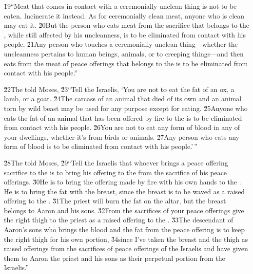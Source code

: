 \v{19}``Meat that comes in contact with a ceremonially unclean thing is not to be eaten. Incinerate it instead. As for ceremonially clean meat, anyone who is clean may eat it. \v{20}But the person who eats meat from the sacrifice that belongs to the , while still affected by his uncleanness, is to be eliminated from contact with his people. \v{21}Any person who touches a ceremonially unclean thing---whether the uncleanness pertains to human beings, animals, or to creeping things---and then eats from the meat of peace offerings that belongs to the  is to be eliminated from contact with his people.''

\v{22}The  told Moses, \v{23}``Tell the Israelis, `You are not to eat the fat of an ox, a lamb, or a goat. \v{24}The carcass of an animal that died of its own and an animal torn by wild beast may be used for any purpose except for eating. \v{25}Anyone who eats the fat of an animal that has been offered by fire to the  is to be eliminated from contact with his people. \v{26}You are not to eat any form of blood in any of your dwellings, whether it's from birds or animals. \v{27}Any person who eats any form of blood is to be eliminated from contact with his people.'\,''

\v{28}The  told Moses, \v{29}``Tell the Israelis that whoever brings a peace offering sacrifice to the  is to bring his offering to the  from the sacrifice of his peace offerings. \v{30}He is to bring the offering made by fire with his own hands to the . He is to bring the fat with the breast, since the breast is to be waved as a raised offering to the . \v{31}The priest will burn the fat on the altar, but the breast belongs to Aaron and his sons. \v{32}From the sacrifices of your peace offerings give the right thigh to the priest as a raised offering to the . \v{33}The descendant of Aaron's sons who brings the blood and the fat from the peace offering is to keep the right thigh for his own portion, \v{34}since I've taken the breast and the thigh as raised offerings from the sacrifices of peace offerings of the Israelis and have given them to Aaron the priest and his sons as their perpetual portion from the Israelis.''

